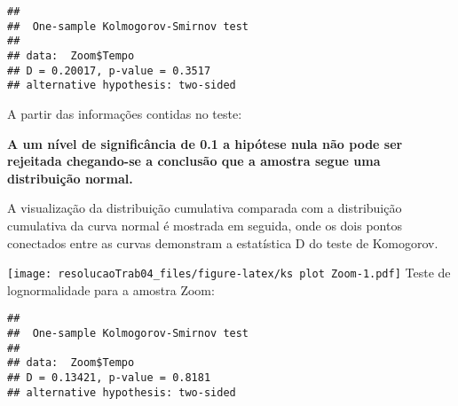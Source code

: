 \documentclass[
]{article}
\newenvironment{Shaded}{\begin{snugshade}}{\end{snugshade}}
\newcommand{\CommentTok}[1]{\textcolor[rgb]{0.56,0.35,0.01}{\textit{#1}}}
\newcommand{\DecValTok}[1]{\textcolor[rgb]{0.00,0.00,0.81}{#1}}
\newcommand{\KeywordTok}[1]{\textcolor[rgb]{0.13,0.29,0.53}{\textbf{#1}}}
\newcommand{\NormalTok}[1]{#1}
\newcommand{\OperatorTok}[1]{\textcolor[rgb]{0.81,0.36,0.00}{\textbf{#1}}}
\newcommand{\StringTok}[1]{\textcolor[rgb]{0.31,0.60,0.02}{#1}}
\begin{document}
\begin{verbatim}
## 
##  One-sample Kolmogorov-Smirnov test
## 
## data:  Zoom$Tempo
## D = 0.20017, p-value = 0.3517
## alternative hypothesis: two-sided
\end{verbatim}

A partir das informações contidas no teste:

\textbf{A um nível de significância de 0.1 a hipótese nula não pode ser
rejeitada chegando-se a conclusão que a amostra segue uma distribuição
normal.}

A visualização da distribuição cumulativa comparada com a distribuição
cumulativa da curva normal é mostrada em seguida, onde os dois pontos
conectados entre as curvas demonstram a estatística D do teste de
Komogorov.

\begin{Shaded}
\end{Shaded}

\texttt{[image: resolucaoTrab04\_files/figure-latex/ks plot Zoom-1.pdf]}
Teste de lognormalidade para a amostra Zoom:

\begin{Shaded}
\end{Shaded}

\begin{verbatim}
## 
##  One-sample Kolmogorov-Smirnov test
## 
## data:  Zoom$Tempo
## D = 0.13421, p-value = 0.8181
## alternative hypothesis: two-sided
\end{verbatim}
\end{document}
